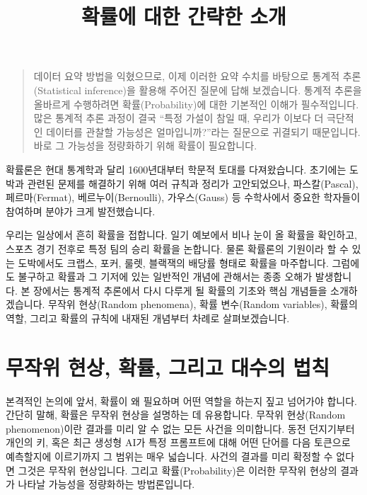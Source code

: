 \documentclass[
]{scrbook}
\title{확률에 대한 간략한 소개}
\author{}
\date{}
\begin{document}
\frontmatter
\maketitle


\mainmatter
\begin{quote}
데이터 요약 방법을 익혔으므로, 이제 이러한 요약 수치를 바탕으로 통계적
추론(Statistical inference)을 활용해 주어진 질문에 답해 보겠습니다.
통계적 추론을 올바르게 수행하려면 확률(Probability)에 대한 기본적인
이해가 필수적입니다. 많은 통계적 추론 과정이 결국 ``특정 가설이 참일 때,
우리가 이보다 더 극단적인 데이터를 관찰할 가능성은 얼마입니까?''라는
질문으로 귀결되기 때문입니다. 바로 그 가능성을 정량화하기 위해 확률이
필요합니다.
\end{quote}

확률론은 현대 통계학과 달리 1600년대부터 학문적 토대를 다져왔습니다.
초기에는 도박과 관련된 문제를 해결하기 위해 여러 규칙과 정리가
고안되었으나, 파스칼(Pascal), 페르마(Fermat), 베르누이(Bernoulli),
가우스(Gauss) 등 수학사에서 중요한 학자들이 참여하며 분야가 크게
발전했습니다.

우리는 일상에서 흔히 확률을 접합니다. 일기 예보에서 비나 눈이 올 확률을
확인하고, 스포츠 경기 전후로 특정 팀의 승리 확률을 논합니다. 물론
확률론의 기원이라 할 수 있는 도박에서도 크랩스, 포커, 룰렛, 블랙잭의
배당률 형태로 확률을 마주합니다. 그럼에도 불구하고 확률과 그 기저에 있는
일반적인 개념에 관해서는 종종 오해가 발생합니다. 본 장에서는 통계적
추론에서 다시 다루게 될 확률의 기초와 핵심 개념들을 소개하겠습니다.
무작위 현상(Random phenomena), 확률 변수(Random variables), 확률의 역할,
그리고 확률의 규칙에 내재된 개념부터 차례로 살펴보겠습니다.

\section{무작위 현상, 확률, 그리고 대수의
법칙}\label{uxbb34uxc791uxc704-uxd604uxc0c1-uxd655uxb960-uxadf8uxb9acuxace0-uxb300uxc218uxc758-uxbc95uxce59}

본격적인 논의에 앞서, 확률이 왜 필요하며 어떤 역할을 하는지 짚고
넘어가야 합니다. 간단히 말해, 확률은 무작위 현상을 설명하는 데
유용합니다. 무작위 현상(Random phenomenon)이란 결과를 미리 알 수 없는
모든 사건을 의미합니다. 동전 던지기부터 개인의 키, 혹은 최근 생성형 AI가
특정 프롬프트에 대해 어떤 단어를 다음 토큰으로 예측할지에 이르기까지 그
범위는 매우 넓습니다. 사건의 결과를 미리 확정할 수 없다면 그것은 무작위
현상입니다. 그리고 확률(Probability)은 이러한 무작위 현상의 결과가
나타날 가능성을 정량화하는 방법론입니다.
\end{document}
